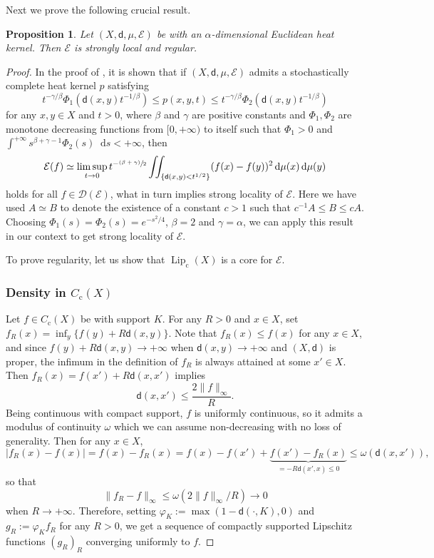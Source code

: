 \documentclass[JEP,XML,SOM,Unicode,published]{cedram}
\newcommand{\rmc}{\mathrm{c}}
\theoremstyle{plain}
\newtheorem{proposition}[theorem]{Proposition}
\theoremstyle{definition}
\newcommand{\cE}{\mathcal{E}}
\newcommand{\cD}{\mathcal{D}}
\let\phi\varphi
\newcommand{\di}{\mathop{}\!\mathrm{d}}
\DeclareMathOperator{\Lip}{Lip}
\newcommand{\dist}{\mathsf{d}}
\begin{document}
Next we prove the following crucial result.

\begin{proposition}\label{prop:slandreg}
Let $(X,\dist,\mu,\cE)$ be with an $\alpha$-dimensional Euclidean heat kernel. Then $\cE$ is strongly local and regular.
\end{proposition}

\begin{proof}
In the proof of \cite[Th.\,4.1]{Grigor'yan}, it is shown that if $(X,\dist,\mu,\cE)$ admits a stochastically complete heat kernel $p$ satisfying
\[
t^{-\gamma/\beta} \Phi_1(\dist(x,y)t^{-1/\beta})\le p(x,y,t)\le t^{-\gamma/\beta} \Phi_2(\dist(x,y)t^{-1/\beta})
\]
for any $x,y \in X$ and $t>0$, where $\beta$ and $\gamma$ are positive constants and $\Phi_1, \Phi_2$ are monotone decreasing functions from $[0,+\infty)$ to itself such that $\Phi_1>0$ and $\int^{+\infty}s^{\beta + \gamma-1}\Phi_2(s)\di s<+\infty$, then
\begin{equation}\label{eq:Grigor'yan}
\cE(f) \simeq \limsup_{t\to 0} t^{-\sfrac{(\beta + \gamma)}{2}} \iint_{\{\dist(x,y)<t^{1/2}\}}(f(x)-f(y))^2\di \mu(x)\di \mu(y)
\end{equation}
holds for all $f \in \cD(\cE)$, what in turn implies strong locality of $\cE$. Here we have used $A\simeq B$ to denote the existence of a constant $c>1$ such that $c^{-1}A\le B \le cA$. Choosing $\Phi_1(s)=\Phi_2(s)=e^{-s^2/4}$, $\beta=2$ and $\gamma = \alpha$, we can apply this result in our context to get strong locality of $\cE$.

To prove regularity, let us show that $\Lip_\rmc(X)$ is a core for $\cE$.

\subsubsection*{Density in $C_\rmc(X)$} Let $f \in C_\rmc(X)$ be with support $K$. For any $R>0$ and $x \in X$, set $f_R(x)=\inf_y \{f(y)+R\dist(x,y)\}$. Note that $f_R(x)\le f(x)$ for any $x \in X$, and since $f(y)+R\dist(x,y)\to +\infty$ when $\dist(x,y) \to +\infty$ and $(X,\dist)$ is proper, the infimum in the definition of $f_R$ is always attained at some $x' \in X$. Then $f_R(x)=f(x')+R\dist(x,x')$ implies
\[
\dist(x,x') \le \frac{2\|f\|_{\infty}}{R}.
\]
Being continuous with compact support, $f$ is uniformly continuous, so it admits a modulus of continuity $\omega$ which we can assume non-decreasing with no loss of generality.
Then for any $x \in X$,
\[
|f_R(x)-f(x)|=f(x)-f_R(x)=f(x)-f(x')+\underbrace{f(x')-f_R(x)}_{=-R\dist(x',x)\le 0} \le \omega(\dist(x,x')),
\]
so that
\[
\|f_R-f\|_{\infty} \le \omega\left(2 \|f\|_{\infty}/R\right) \to 0
\]
when $R \to +\infty$. Therefore, setting $\phi_K:=\max(1-\dist(\cdot,K),0)$ and $g_R:=\phi_K f_R$ for any $R>0$, we get a sequence of compactly supported Lipschitz functions $(g_R)_R$ converging uniformly to $f$.


\end{proof}
\end{document}
